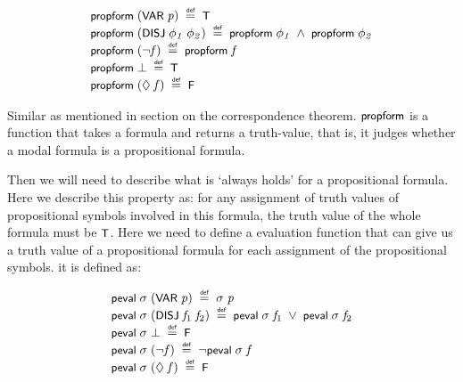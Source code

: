 \documentclass[letterpaper]{article}
\renewcommand{\HOLConst}[1]{{\textsf{\upshape\small #1}}}
\renewcommand{\HOLinline}[1]{\ensuremath{#1}}
\newenvironment{holmath}{\begin{displaymath}\begin{array}{l}}{\end{array}\end{displaymath}\ignorespacesafterend}
\begin{document}
\begin{holmath}
  \HOLConst{propform}\;(\HOLConst{VAR}\;\HOLFreeVar{p})\;\HOLSymConst{\HOLTokenDefEquality{}}\;\HOLConst{T}\\
\HOLConst{propform}\;(\HOLConst{DISJ}\;\HOLFreeVar{\ensuremath{\phi\sb{1}}}\;\HOLFreeVar{\ensuremath{\phi\sb{2}}})\;\HOLSymConst{\HOLTokenDefEquality{}}\;\HOLConst{propform}\;\HOLFreeVar{\ensuremath{\phi\sb{1}}}\;\HOLSymConst{\HOLTokenConj{}}\;\HOLConst{propform}\;\HOLFreeVar{\ensuremath{\phi\sb{2}}}\\
\HOLConst{propform}\;(\HOLSymConst{\HOLTokenNeg{}}\HOLFreeVar{f})\;\HOLSymConst{\HOLTokenDefEquality{}}\;\HOLConst{propform}\;\HOLFreeVar{f}\\
\HOLConst{propform}\;\HOLSymConst{\ensuremath{\bot}}\;\HOLSymConst{\HOLTokenDefEquality{}}\;\HOLConst{T}\\
\HOLConst{propform}\;(\HOLSymConst{\ensuremath{\Diamond}}\;\HOLFreeVar{f})\;\HOLSymConst{\HOLTokenDefEquality{}}\;\HOLConst{F}
\end{holmath}

Similar as mentioned in section on the correspondence theorem. \HOLinline{\HOLConst{propform}} is a function that takes a formula and returns a truth-value, that is, it judges whether a modal formula is a propositional formula.

Then we will need to describe what is `always holds' for a propositional formula. Here we describe this property as: for any assignment of truth values of propositional symbols involved in this formula, the truth value of the whole formula must be \HOLinline{\HOLConst{T}}. Here we need to define a evaluation function that can give us a truth value of a propositional formula for each assignment of the propositional symbols. it is defined as:

\begin{holmath}
  \HOLConst{peval}\;\HOLFreeVar{\ensuremath{\sigma}}\;(\HOLConst{VAR}\;\HOLFreeVar{p})\;\HOLSymConst{\HOLTokenDefEquality{}}\;\HOLFreeVar{\ensuremath{\sigma}}\;\HOLFreeVar{p}\\
\HOLConst{peval}\;\HOLFreeVar{\ensuremath{\sigma}}\;(\HOLConst{DISJ}\;\HOLFreeVar{f\sb{\mathrm{1}}}\;\HOLFreeVar{f\sb{\mathrm{2}}})\;\HOLSymConst{\HOLTokenDefEquality{}}\;\HOLConst{peval}\;\HOLFreeVar{\ensuremath{\sigma}}\;\HOLFreeVar{f\sb{\mathrm{1}}}\;\HOLSymConst{\HOLTokenDisj{}}\;\HOLConst{peval}\;\HOLFreeVar{\ensuremath{\sigma}}\;\HOLFreeVar{f\sb{\mathrm{2}}}\\
\HOLConst{peval}\;\HOLFreeVar{\ensuremath{\sigma}}\;\HOLSymConst{\ensuremath{\bot}}\;\HOLSymConst{\HOLTokenDefEquality{}}\;\HOLConst{F}\\
\HOLConst{peval}\;\HOLFreeVar{\ensuremath{\sigma}}\;(\HOLSymConst{\HOLTokenNeg{}}\HOLFreeVar{f})\;\HOLSymConst{\HOLTokenDefEquality{}}\;\HOLSymConst{\HOLTokenNeg{}}\HOLConst{peval}\;\HOLFreeVar{\ensuremath{\sigma}}\;\HOLFreeVar{f}\\
\HOLConst{peval}\;\HOLFreeVar{\ensuremath{\sigma}}\;(\HOLSymConst{\ensuremath{\Diamond}}\;\HOLFreeVar{f})\;\HOLSymConst{\HOLTokenDefEquality{}}\;\HOLConst{F}
\end{holmath}
\end{document}
